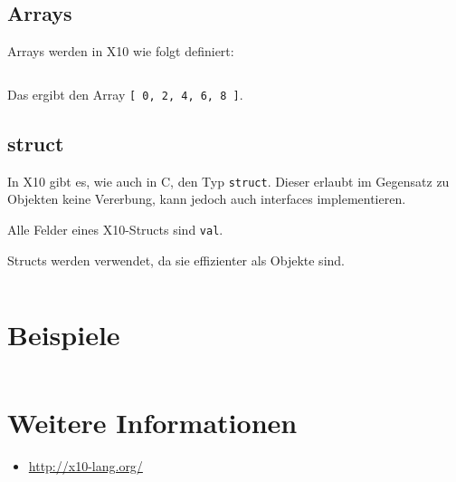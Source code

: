 \subsection{Arrays}%
Arrays werden in X10 wie folgt definiert:

\inputminted[numbersep=5pt, tabsize=4]{scala}{scripts/x10/array-example.x10}

Das ergibt den Array \texttt{[ 0, 2, 4, 6, 8 ]}.

\subsection{struct}%
In X10 gibt es, wie auch in C, den Typ \texttt{struct}. Dieser erlaubt im Gegensatz
zu Objekten keine Vererbung, kann jedoch auch interfaces implementieren.

Alle Felder eines X10-Structs sind \texttt{val}.

Structs werden verwendet, da sie effizienter als Objekte sind.

\begin{beispiel}[struct]
    \inputminted[numbersep=5pt, tabsize=4]{scala}{scripts/x10/x10-struct-example.x10}
\end{beispiel}

\section{Beispiele}

\inputminted[linenos, numbersep=5pt, tabsize=4, frame=lines, label=Fibonacci.x10]{scala}{scripts/x10/Fibonacci.x10}

\section{Weitere Informationen}
\begin{itemize}
    \item \url{http://x10-lang.org/}
\end{itemize}
